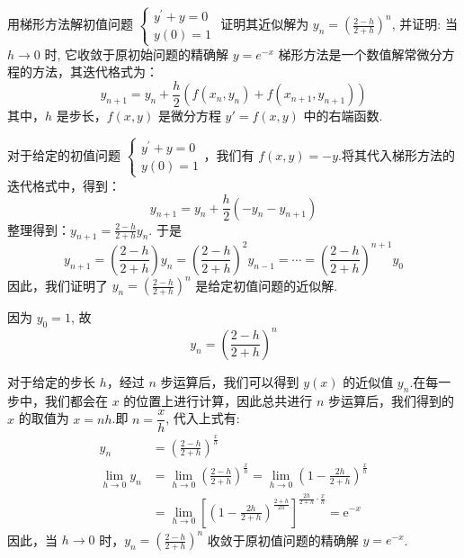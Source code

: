      \begin{tcolorbox}[breakable,enhanced,arc=0mm,outer arc=0mm,
		boxrule=0pt,toprule=1pt,leftrule=0pt,bottomrule=1pt, rightrule=0pt,left=0.2cm,right=0.2cm,
		titlerule=0.5em,toptitle=0.1cm,bottomtitle=-0.1cm,top=0.2cm,
		colframe=white!10!biru,colback=white!90!biru,coltitle=white,
            coltext=black,title =2024-04, title style={white!10!biru}, before skip=8pt, after skip=8pt,before upper=\hspace{2em},
		fonttitle=\bfseries,fontupper=\normalsize]
用梯形方法解初值问题 $ \left\{\begin{array}{c}y^{\prime}+y=0 \\ y(0)=1\end{array}\right. $ 证明其近似解为 $ y_{n}=\left(\frac{2-h}{2+h}\right)^{n} $, 并证明: 当 $ h \rightarrow 0 $ 时, 它收敛于原初始问题的精确解 $ y=e^{-x} $
\tcblower
梯形方法是一个数值解常微分方程的方法，其迭代格式为：
$$ y_{n+1} = y_n + \frac{h}{2}(f(x_n, y_n) + f(x_{n+1}, y_{n+1})) $$
其中，$ h $ 是步长，$ f(x, y) $ 是微分方程 $ y' = f(x, y) $ 中的右端函数.

对于给定的初值问题 $ \left\{\begin{array}{l}y^{\prime}+y=0 \\ y(0)=1\end{array}\right. $，我们有 $ f(x, y) = -y $.将其代入梯形方法的迭代格式中，得到：
$$ y_{n+1} = y_n + \frac{h}{2}(-y_n - y_{n+1}) $$
整理得到：$ y_{n+1} = \frac{2-h}{2+h}y_n $. 于是
$$
y_{n+1}=\left(\frac{2-h}{2+h}\right) y_{n}=\left(\frac{2-h}{2+h}\right)^{2} y_{n-1}=\cdots=\left(\frac{2-h}{2+h}\right)^{n+1} y_{0}
$$
因此，我们证明了 $ y_{n}=\left(\frac{2-h}{2+h}\right)^{n} $ 是给定初值问题的近似解.

因为 $ y_{0}=1 $, 故
$$
y_{n}=\left(\frac{2-h}{2+h}\right)^{n}
$$

对于给定的步长 $ h $，经过 $ n $ 步运算后，我们可以得到 $ y(x) $ 的近似值 $ y_n$.在每一步中，我们都会在 $ x $ 的位置上进行计算，因此总共进行 $ n $ 步运算后，我们得到的 $ x $ 的取值为 $ x = nh $.即 $ n=\dfrac{x}{h} $, 代入上式有:
$$
\begin{aligned}
y_{n}&=\left(\frac{2-h}{2+h}\right)^{\frac x  h} \\
\lim _{h \rightarrow 0} y_{n}&=\lim _{h \rightarrow 0}\left(\frac{2-h}{2+h}\right)^{\frac{x}{h}}=\lim _{h \rightarrow 0}\left(1-\frac{2 h}{2+h}\right)^{\frac{x}{h}} \\
&=\lim _{h \rightarrow 0}\left[\left(1-\frac{2 h}{2+h}\right)^{\frac{2+h}{2 h}}\right]^{\frac{2 h}{2+h}\cdot \frac{x}{h}}=\mathrm{e}^{-x}
\end{aligned}
$$
因此，当 $ h \rightarrow 0 $ 时，$ y_{n}=\left(\frac{2-h}{2+h}\right)^{n} $ 收敛于原初值问题的精确解 $ y=e^{-x} $.

  \end{tcolorbox}


